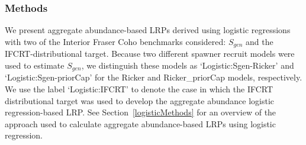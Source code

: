 \documentclass[11pt]{book}
\begin{document}
\hypertarget{logistic}{%
\subsubsection{Methods}\label{logistic}}

We present aggregate abundance-based LRPs derived using logistic regressions with two of the Interior Fraser Coho benchmarks considered: \(S_{gen}\) and the IFCRT-distributional target. Because two different spawner recruit models were used to estimate \(S_{gen}\), we distinguish these models as `Logistic:Sgen-Ricker' and `Logistic:Sgen-priorCap' for the Ricker and Ricker\_priorCap models, respectively. We use the label `Logistic:IFCRT' to denote the case in which the IFCRT distributional target was used to develop the aggregate abundance logistic regression-based LRP. See Section~\ref{logisticMethods} for an overview of the approach used to calculate aggregate abundance-based LRPs using logistic regression.
\end{document}
